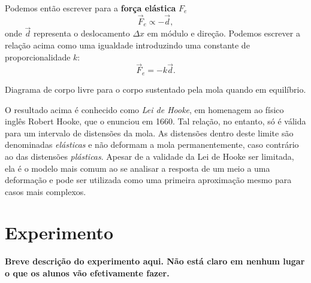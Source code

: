 Podemos então escrever para a \textbf{força elástica} $F_e$
\begin{equation}
	\vec{F}_e \propto -\vec{d},
\end{equation}
%
onde $\vec{d}$ representa o deslocamento $\Delta x$ em módulo e direção. Podemos escrever a relação acima como uma igualdade introduzindo uma constante de proporcionalidade $k$:
\begin{equation}
	\vec{F}_e = -k \vec{d}.
\end{equation}

\begin{marginfigure}
\centering
{}
\caption{Diagrama de corpo livre para o corpo sustentado pela mola quando em equilíbrio.}
\label{DiagramaCorpoLivre}
\end{marginfigure}

O resultado acima é conhecido como \emph{Lei de Hooke}, em homenagem ao físico inglês Robert Hooke, que o enunciou em 1660. Tal relação, no entanto, só é válida para um intervalo de distensões da mola. As distensões dentro deste limite são denominadas \emph{elásticas} e não deformam a mola permanentemente, caso contrário ao das distensões \emph{plásticas}. Apesar de a validade da Lei de Hooke ser limitada, ela é o modelo mais comum ao se analisar a resposta de um meio a uma deformação e pode ser utilizada como uma primeira aproximação mesmo para casos mais complexos.


\section{Experimento}

\textbf{Breve descrição do experimento aqui. Não está claro em nenhum lugar o que os alunos vão efetivamente fazer.}

